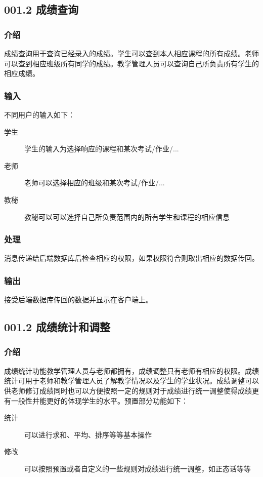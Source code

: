   \subsection{001.2 成绩查询}
    \subsubsection{介绍}
    成绩查询用于查询已经录入的成绩。学生可以查到本人相应课程的所有成绩。老师可以查到相应班级所有同学的成绩。教学管理人员可以查询自己所负责所有学生的相应成绩。
    \subsubsection{输入}
    不同用户的输入如下：
    \begin{center}\begin{description}
      \item[学生] 学生的输入为选择响应的课程和某次考试/作业/...
      \item[老师] 老师可以选择相应的班级和某次考试/作业/...
      \item[教秘] 教秘可以可以选择自己所负责范围内的所有学生和课程的相应信息
    \end{description}\end{center}
    \subsubsection{处理}
    消息传递给后端数据库后检查相应的权限，如果权限符合则取出相应的数据传回。
    \subsubsection{输出}
    接受后端数据库传回的数据并显示在客户端上。

  \subsection{001.2 成绩统计和调整}
    \subsubsection{介绍}
    成绩统计功能教学管理人员与老师都拥有，成绩调整只有老师有相应的权限。成绩统计可用于老师和教学管理人员了解教学情况以及学生的学业状况。成绩调整可以供老师修订成绩同时也可以方便按照一定的规则对于成绩进行统一调整使得成绩更有一般性并能更好的体现学生的水平。预置部分功能如下：
    \begin{description}
      \item[统计] 可以进行求和、平均、排序等等基本操作
      \item[修改] 可以按照预置或者自定义的一些规则对成绩进行统一调整，如正态话等等
    \end{description}
